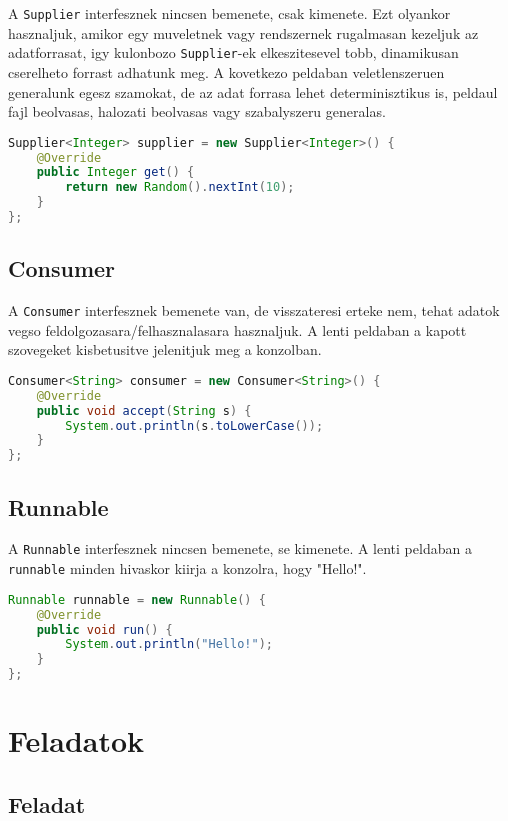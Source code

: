 \documentclass{article}
\let\l\lstinline
\begin{document}
A \l{Supplier} interfesznek nincsen bemenete, csak kimenete. Ezt olyankor hasznaljuk, amikor egy muveletnek vagy rendszernek rugalmasan kezeljuk az adatforrasat, igy kulonbozo \l{Supplier}-ek elkeszitesevel tobb, dinamikusan cserelheto forrast adhatunk meg. A kovetkezo peldaban veletlenszeruen generalunk egesz szamokat, de az adat forrasa lehet determinisztikus is, peldaul fajl beolvasas, halozati beolvasas vagy szabalyszeru generalas.

\begin{lstlisting}[language=Java, caption=Pelda Supplier]
Supplier<Integer> supplier = new Supplier<Integer>() {
	@Override
	public Integer get() {
		return new Random().nextInt(10);
	}
};
\end{lstlisting}

\subsection{Consumer}
A \l{Consumer} interfesznek bemenete van, de visszateresi erteke nem, tehat adatok vegso feldolgozasara/felhasznalasara hasznaljuk. A lenti peldaban a kapott szovegeket kisbetusitve jelenitjuk meg a konzolban.

\begin{lstlisting}[language=Java, caption=Pelda Consumer]
Consumer<String> consumer = new Consumer<String>() {
	@Override
	public void accept(String s) {
		System.out.println(s.toLowerCase());
	}
};
\end{lstlisting}

\subsection{Runnable}

A \l{Runnable} interfesznek nincsen bemenete, se kimenete. A lenti peldaban a \l{runnable} minden hivaskor kiirja a konzolra, hogy "Hello!".

\begin{lstlisting}[language=Java, caption=Pelda Function]
Runnable runnable = new Runnable() {
	@Override
	public void run() {
		System.out.println("Hello!");
	}
};
\end{lstlisting}


\section{Feladatok}

\subsection{Feladat}
\end{document}
